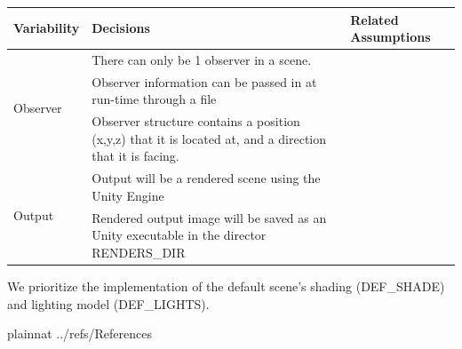\documentclass[12pt]{article}
\begin{document}
\begin{table}[H]
	\begin{tabular}{|p{4cm}|p{8cm}|p{2.4cm}|}
		\hline
		\textbf{Variability} & \textbf{Decisions} & 
		\textbf{Related Assumptions}\\
		\hline
		\multirow{3}{*}{Observer} & There can only be 1 observer in a scene. &	
		\\
		& Observer information can be passed in at run-time through a file & \\
		& Observer structure contains a position (x,y,z) that it is located at, 
		and a direction that it is facing. & \\
		\hline		
		\multirow{2}{*}{Output} & Output will be a rendered scene using the 
		Unity Engine & \\
		& Rendered output image will be saved as an Unity executable in the 
		director RENDERS\_DIR & \\
		\hline		
	\end{tabular}
\end{table}

We prioritize the implementation of the default scene's shading (DEF\_SHADE) 
and lighting model (DEF\_LIGHTS). 



\newpage

 {plainnat}
 {../refs/References}

\newpage
\end{document}
